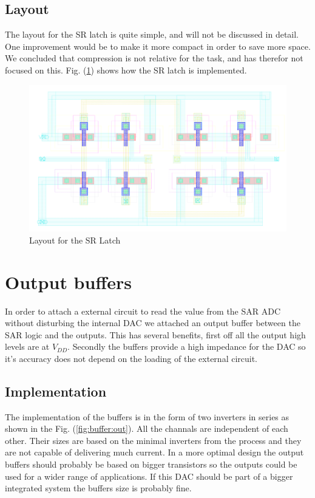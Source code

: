 \documentclass[english, 12pt, a4paper]{ifimaster}
\begin{document}
\subsection{Layout}
The layout for the SR latch is quite simple, and will not be discussed in detail. One improvement would be to make it more compact in order to save more space. 
We concluded that compression is not relative for the task, and has therefor not focused on this. Fig. (\ref{fig:layout:srlatch}) shows how the SR latch is implemented. 

\begin{figure}[!ht]
 \centering
 \includegraphics[width=\textwidth]{img/layout/srlatch}
 \caption{Layout for the SR Latch}
 \label{fig:layout:srlatch}
\end{figure}



\section{Output buffers}
In order to attach a external circuit to read the value from the SAR ADC without disturbing the internal DAC we attached an output buffer between the SAR logic and the outputs.
This has several benefits, first off all the output high levels are at \(V_{DD}\). 
Secondly the buffers provide a high impedance for the DAC so it's accuracy does not depend on the loading of the external circuit.

\subsection{Implementation}
The implementation of the buffers is in the form of two inverters in series as shown in the Fig. (\ref{fig:buffer:out}). All the channals are independent of each other. 
Their sizes are based on the minimal inverters from the process and they are not capable of delivering much current. 
In a more optimal design the output buffers should probably be based on bigger transistors so the outputs could be used for a wider range of applications.
If this DAC should be part of a bigger integrated system
the buffers size is probably fine.
\end{document}
